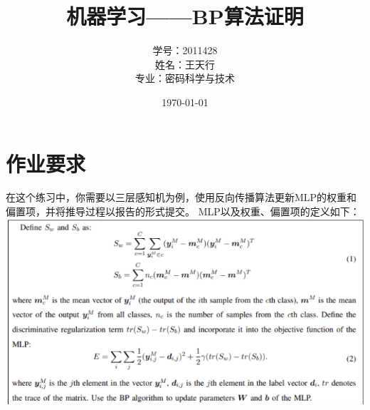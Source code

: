 \documentclass[UTF8]{ctexart}
\title{机器学习——BP算法证明}
\author{学号：2011428 \\ 姓名：王天行 \\ 专业：密码科学与技术}
\date{\today}
\begin{document}
\maketitle
\clearpage

\section{作业要求}
在这个练习中，你需要以三层感知机为例，使用反向传播算法更新MLP的权重和偏置项，并将推导过程以报告的形式提交。
MLP以及权重、偏置项的定义如下：\\
\includegraphics[width = 1\textwidth]{1.jpg}
\end{document}
